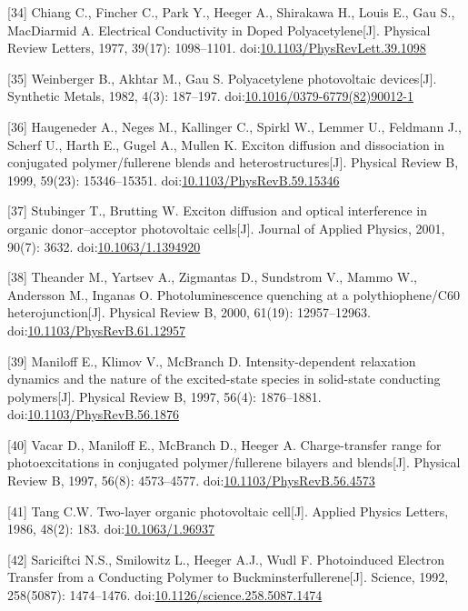 \documentclass[12pt,]{report}
\begin{document}
{[}34{]} Chiang C., Fincher C., Park Y., Heeger A., Shirakawa H., Louis
E., Gau S., MacDiarmid A. Electrical Conductivity in Doped
Polyacetylene{[}J{]}. Physical Review Letters, 1977, 39(17): 1098--1101.
doi:\href{http://dx.doi.org/10.1103/PhysRevLett.39.1098}{10.1103/PhysRevLett.39.1098}

{[}35{]} Weinberger B., Akhtar M., Gau S. Polyacetylene photovoltaic
devices{[}J{]}. Synthetic Metals, 1982, 4(3): 187--197.
doi:\href{http://dx.doi.org/10.1016/0379-6779(82)90012-1}{10.1016/0379-6779(82)90012-1}

{[}36{]} Haugeneder A., Neges M., Kallinger C., Spirkl W., Lemmer U.,
Feldmann J., Scherf U., Harth E., Gugel A., Mullen K. Exciton diffusion
and dissociation in conjugated polymer/fullerene blends and
heterostructures{[}J{]}. Physical Review B, 1999, 59(23): 15346--15351.
doi:\href{http://dx.doi.org/10.1103/PhysRevB.59.15346}{10.1103/PhysRevB.59.15346}

{[}37{]} Stubinger T., Brutting W. Exciton diffusion and optical
interference in organic donor--acceptor photovoltaic cells{[}J{]}.
Journal of Applied Physics, 2001, 90(7): 3632.
doi:\href{http://dx.doi.org/10.1063/1.1394920}{10.1063/1.1394920}

{[}38{]} Theander M., Yartsev A., Zigmantas D., Sundstrom V., Mammo W.,
Andersson M., Inganas O. Photoluminescence quenching at a
polythiophene/C60 heterojunction{[}J{]}. Physical Review B, 2000,
61(19): 12957--12963.
doi:\href{http://dx.doi.org/10.1103/PhysRevB.61.12957}{10.1103/PhysRevB.61.12957}

{[}39{]} Maniloff E., Klimov V., McBranch D. Intensity-dependent
relaxation dynamics and the nature of the excited-state species in
solid-state conducting polymers{[}J{]}. Physical Review B, 1997, 56(4):
1876--1881.
doi:\href{http://dx.doi.org/10.1103/PhysRevB.56.1876}{10.1103/PhysRevB.56.1876}

{[}40{]} Vacar D., Maniloff E., McBranch D., Heeger A. Charge-transfer
range for photoexcitations in conjugated polymer/fullerene bilayers and
blends{[}J{]}. Physical Review B, 1997, 56(8): 4573--4577.
doi:\href{http://dx.doi.org/10.1103/PhysRevB.56.4573}{10.1103/PhysRevB.56.4573}

{[}41{]} Tang C.W. Two-layer organic photovoltaic cell{[}J{]}. Applied
Physics Letters, 1986, 48(2): 183.
doi:\href{http://dx.doi.org/10.1063/1.96937}{10.1063/1.96937}

{[}42{]} Sariciftci N.S., Smilowitz L., Heeger A.J., Wudl F.
Photoinduced Electron Transfer from a Conducting Polymer to
Buckminsterfullerene{[}J{]}. Science, 1992, 258(5087): 1474--1476.
doi:\href{http://dx.doi.org/10.1126/science.258.5087.1474}{10.1126/science.258.5087.1474}
\end{document}
